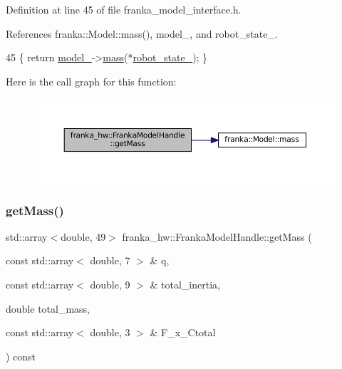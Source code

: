 Definition at line 45 of file franka\+\_\+model\+\_\+interface.\+h.



References franka\+::\+Model\+::mass(), model\+\_\+, and robot\+\_\+state\+\_\+.


\begin{DoxyCode}
45 \{ \textcolor{keywordflow}{return} \hyperlink{classfranka__hw_1_1FrankaModelHandle_a0c47e6c735f1bd809581b0498d53349b}{model\_}->\hyperlink{classfranka_1_1Model_a39eefe959a2a9155b4782b98ad766530}{mass}(*\hyperlink{classfranka__hw_1_1FrankaModelHandle_a16192f263ce4709d99f557c6d8fabeb1}{robot\_state\_}); \}
\end{DoxyCode}
Here is the call graph for this function\+:
\nopagebreak
\begin{figure}[H]
\begin{center}
\leavevmode
\includegraphics[width=350pt]{classfranka__hw_1_1FrankaModelHandle_a252d6872afa722e55d2a9cba4ac42088_cgraph}
\end{center}
\end{figure}
\mbox{\label{classfranka__hw_1_1FrankaModelHandle_a72d3355fbea921d7c6fbef17062b69a6}} 
\subsubsection{\texorpdfstring{get\+Mass()}{getMass()}\hspace{0.1cm}{\footnotesize\ttfamily [2/2]}}
{\footnotesize\ttfamily std\+::array$<$double, 49$>$ franka\+\_\+hw\+::\+Franka\+Model\+Handle\+::get\+Mass (\begin{DoxyParamCaption}\item[{const std\+::array$<$ double, 7 $>$ \&}]{q,  }\item[{const std\+::array$<$ double, 9 $>$ \&}]{total\+\_\+inertia,  }\item[{double}]{total\+\_\+mass,  }\item[{const std\+::array$<$ double, 3 $>$ \&}]{F\+\_\+x\+\_\+\+Ctotal }\end{DoxyParamCaption}) const\hspace{0.3cm}{\ttfamily [inline]}}

